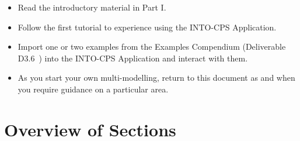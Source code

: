 \begin{itemize}[noitemsep]
  \item Read the introductory material in Part I.
  \item Follow the first tutorial to experience using the INTO-CPS Application.
  \item Import one or two examples from the Examples Compendium (Deliverable D3.6~\cite{INTOCPSD3.6}) into the INTO-CPS Application and interact with them.
  \item As you start your own multi-modelling, return to this document as and when you require guidance on a particular area.
\end{itemize}

\section{Overview of Sections}
\label{sec:intro:overview}

